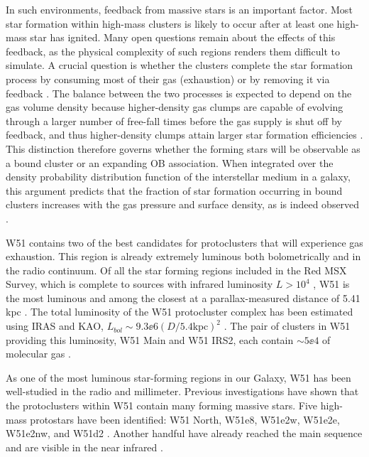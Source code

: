In such environments, feedback from massive stars is an important factor.  Most star
formation within high-mass clusters is likely to occur after at least one
high-mass star has ignited.  Many open questions remain about the effects of
this feedback, as the physical complexity of such regions renders them
difficult to simulate.  A crucial question is whether the clusters complete the
star formation process by consuming most of their gas (exhaustion) or
by removing it via feedback 
\citep[expulsion;][]{Kruijssen2012b,Longmore2014a,Matzner2015a}.
The balance between the two processes is expected to depend on the gas volume
density because higher-density gas clumps are capable of evolving through a
larger number of free-fall times before the gas supply is shut off by feedback,
and thus higher-density clumps attain larger star formation efficiencies
\citep{Kruijssen2012a}.
This distinction therefore governs whether the forming stars will be observable as a
bound cluster or an expanding OB association.
When integrated over the density probability distribution function of the
interstellar medium in a galaxy, this argument predicts that the fraction of
star formation occurring in bound clusters increases with the gas pressure and
surface density, as is indeed observed \citep{Goddard2010a,Kruijssen2012a,Adamo2015a}.


W51 contains two of the best candidates for protoclusters that will experience
gas exhaustion.  This region is already extremely luminous both bolometrically
and in the radio continuum.  Of all the star forming regions included in the
Red MSX Survey, which is complete to sources with infrared luminosity $L>10^4$
\lsun, W51 is the most luminous \citep{Urquhart2014a} and among the closest at
a parallax-measured distance of 5.41 kpc \citep{Sato2010a,Xu2009a}.  The total
luminosity of the W51 protocluster complex has been estimated using IRAS and
KAO, $L_{bol}\sim9.3\ee{6} (D/5.4\mathrm{kpc})^2$ \lsun
\citep{Harvey1986a,Sievers1991a}.  The pair of clusters in W51 providing this
luminosity, W51 Main and W51 IRS2, each contain $\sim5\ee{4}$ \msun of
molecular gas \citep{Ginsburg2012a}.

As one of the most luminous star-forming regions in our Galaxy, W51 has been
well-studied in the radio and millimeter.  
Previous investigations have shown that the protoclusters within W51 contain many
forming massive stars. Five high-mass protostars have been identified:
W51 North, W51e8, W51e2w, W51e2e, W51e2nw, and W51d2
\citep{Zhang1997a,Keto2008b,Zapata2008a,Zapata2009a,Zapata2010a,Shi2010b,Shi2010a,Surcis2012a,Goddi2015a,Goddi2016a}.
Another handful have already reached the main sequence and are visible in the
near infrared
\citep{Goldader1994a,Okumura2000a,Kumar2004a,Barbosa2008a,Figueredo2008a}.

